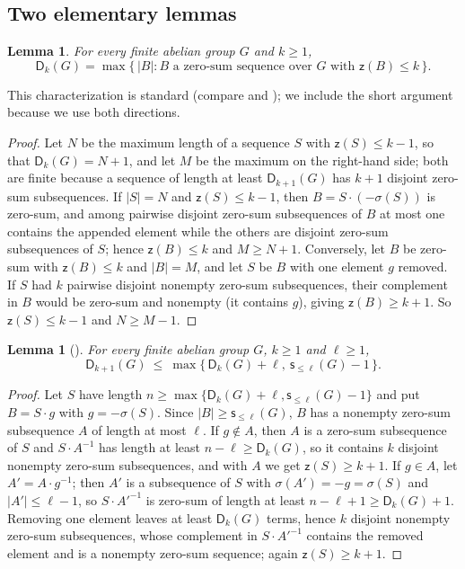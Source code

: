 \documentclass[11pt]{article}
\newtheorem{lemma}[theorem]{Lemma}
\theoremstyle{definition}
\theoremstyle{remark}
\newcommand{\Dk}{\mathsf{D}}
\newcommand{\zz}{\mathsf{z}}
\newcommand{\sle}[1]{\mathsf{s}_{\le #1}}
\begin{document}
\subsection{Two elementary lemmas}

\begin{lemma}\label{lem:Dk-char}
For every finite abelian group $G$ and $k\ge1$,
\[
\Dk_k(G)=\max\{\,|B| : B \text{ a zero-sum sequence over } G \text{ with } \zz(B)\le k\,\}.
\]
\end{lemma}

This characterization is standard (compare \cite[Section~6.1]{GeroldingerHalterKoch2006} and \cite{FreezeSchmid2010}); we include the short argument because we use both directions.

\begin{proof}
Let $N$ be the maximum length of a sequence $S$ with $\zz(S)\le k-1$, so that $\Dk_k(G)=N+1$, and let $M$ be the maximum on the right-hand side; both are finite because a sequence of length at least $\Dk_{k+1}(G)$ has $k+1$ disjoint zero-sum subsequences. If $|S|=N$ and $\zz(S)\le k-1$, then $B=S\cdot(-\sigma(S))$ is zero-sum, and among pairwise disjoint zero-sum subsequences of $B$ at most one contains the appended element while the others are disjoint zero-sum subsequences of $S$; hence $\zz(B)\le k$ and $M\ge N+1$. Conversely, let $B$ be zero-sum with $\zz(B)\le k$ and $|B|=M$, and let $S$ be $B$ with one element $g$ removed. If $S$ had $k$ pairwise disjoint nonempty zero-sum subsequences, their complement in $B$ would be zero-sum and nonempty (it contains $g$), giving $\zz(B)\ge k+1$. So $\zz(S)\le k-1$ and $N\ge M-1$.
\end{proof}

\begin{lemma}[{\cite[Proposition~3.1]{FreezeSchmid2010}}]\label{lem:recurrence}
For every finite abelian group $G$, $k\ge1$ and $\ell\ge1$,
\[
\Dk_{k+1}(G)\ \le\ \max\{\,\Dk_k(G)+\ell,\ \sle{\ell}(G)-1\,\}.
\]
\end{lemma}

\begin{proof}
Let $S$ have length $n\ge\max\{\Dk_k(G)+\ell,\sle{\ell}(G)-1\}$ and put $B=S\cdot g$ with $g=-\sigma(S)$. Since $|B|\ge\sle{\ell}(G)$, $B$ has a nonempty zero-sum subsequence $A$ of length at most $\ell$. If $g\notin A$, then $A$ is a zero-sum subsequence of $S$ and $S\cdot A^{-1}$ has length at least $n-\ell\ge\Dk_k(G)$, so it contains $k$ disjoint nonempty zero-sum subsequences, and with $A$ we get $\zz(S)\ge k+1$. If $g\in A$, let $A'=A\cdot g^{-1}$; then $A'$ is a subsequence of $S$ with $\sigma(A')=-g=\sigma(S)$ and $|A'|\le\ell-1$, so $S\cdot A'^{-1}$ is zero-sum of length at least $n-\ell+1\ge\Dk_k(G)+1$. Removing one element leaves at least $\Dk_k(G)$ terms, hence $k$ disjoint nonempty zero-sum subsequences, whose complement in $S\cdot A'^{-1}$ contains the removed element and is a nonempty zero-sum sequence; again $\zz(S)\ge k+1$.
\end{proof}
\end{document}
